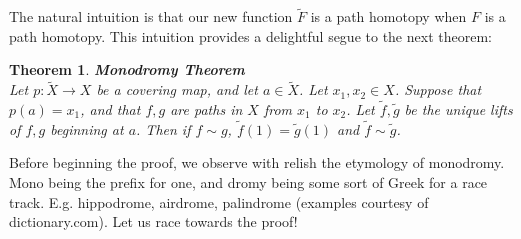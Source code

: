 \documentclass[11pt,reqno]{amsart}
\newtheorem{Theorem}{Theorem}
\theoremstyle{definition}
\begin{document}
  The natural intuition is that our new function $\tilde{F}$ is a path homotopy when $F$ is a path homotopy. This intuition provides a delightful segue to the next theorem:
  \begin{Theorem}
  \textbf{Monodromy Theorem}\\
  Let $p\colon \tilde{X}\to X$ be a covering map, and let $a\in \tilde{X}$. Let $x_1,x_2\in X$. Suppose that $p(a)=x_1$, and that $f,g$ are paths in $X$ from $x_1$ to $x_2$. Let $\tilde{f}, \tilde{g}$ be the unique lifts of $f,g$ beginning at $a$. Then if $f\sim g$, $\tilde{f}(1)=\tilde{g}(1)$ and $\tilde{f}\sim \tilde{g}$.
  \end{Theorem}
   \par
   Before beginning the proof, we observe with relish the etymology of monodromy. Mono being the prefix for one, and dromy being some sort of Greek for a race track. E.g. hippodrome, airdrome, palindrome (examples courtesy of dictionary.com). Let us race towards the proof!
\end{document}
